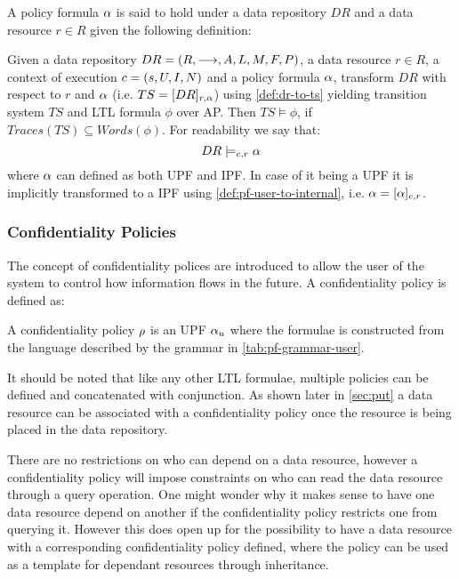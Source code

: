 A policy formula $\alpha$ is said to hold under a data repository $DR$ and a data resource $r \in R$ given the following definition:
\begin{definition}
Given a data repository $DR= \left( R, \longrightarrow, A, L, M, F, P \right)$, a data resource $r \in R$, a context of execution $c = \left( s, U, I, N \right)$ and a policy formula $\alpha$, transform $DR$ with respect to $r$ and $\alpha$ (i.e. $TS = [DR]_{r,\alpha}$) using \autoref{def:dr-to-ts} yielding transition system $TS$ and LTL formula $\phi$ over AP. Then $TS \models \phi$, if $Traces(TS) \subseteq Words(\phi)$. For readability we say that:
\begin{equation*}
    DR \models_{c,r} \alpha
\end{equation*}
where $\alpha$ can defined as both UPF and IPF. In case of it being a UPF it is implicitly transformed to a IPF using \autoref{def:pf-user-to-internal}, i.e. $\alpha = [\alpha]_{c,r}$.
\end{definition}

\subsubsection{Confidentiality Policies}
The concept of confidentiality polices are introduced to allow the user of the system to control how information flows in the future. A confidentiality policy is defined as:
\begin{definition}\label{def:cp}
A confidentiality policy $\rho$ is an UPF $\alpha_u$ where the formulae is constructed from the language described by the grammar in \autoref{tab:pf-grammar-user}.
\end{definition}
It should be noted that like any other LTL formulae, multiple policies can be defined and concatenated with conjunction. As shown later in \autoref{sec:put} a data resource can be associated with a confidentiality policy once the resource is being placed in the data repository. 

There are no restrictions on who can depend on a data resource, however a confidentiality policy will impose constraints on who can read the data resource through a query operation. One might wonder why it makes sense to have one data resource depend on another if the confidentiality policy restricts one from querying it. However this does open up for the possibility to have a data resource with a corresponding confidentiality policy defined, where the policy can be used as a template for dependant resources through inheritance.

